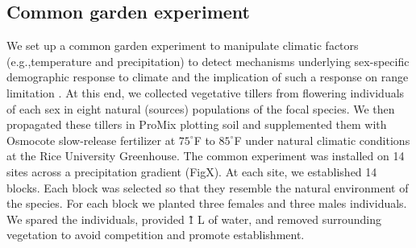 \documentclass[11pt]{article}
\begin{document}
\subsection*{Common garden experiment}
We set up a common garden experiment to manipulate climatic factors (e.g.,temperature and precipitation) to detect mechanisms underlying sex-specific demographic response to climate and the implication of such a response on range limitation \citep{merow2017climate,schwinning2022common}. 
At this end, we collected vegetative tillers from flowering individuals of each sex in eight natural (sources) populations of the focal species.
We then propagated these tillers in ProMix plotting soil and supplemented them with Osmocote slow-release fertilizer at $75^\circ$F to $85^\circ$F under natural climatic conditions at the Rice University Greenhouse. 
The common experiment was installed on 14 sites across a precipitation gradient (FigX). At each site, we established 14 blocks. Each block was selected so that they resemble the natural environment of the species. For each block we planted three females and three males individuals. We spared the individuals, provided \~ 1 L  of water, and removed surrounding vegetation to avoid competition and promote establishment. 
\end{document}
